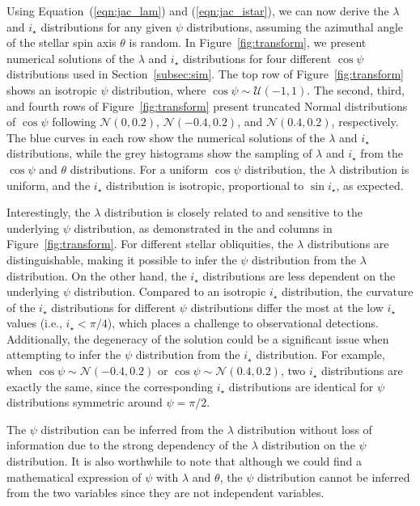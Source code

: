 \documentclass[twocolumn,times,linenumbers]{aastex631}
\begin{document}
Using Equation~(\ref{eqn:jac_lam}) and (\ref{eqn:jac_istar}), we can now derive the $\lambda$ and $i_\star$ distributions for any given $\psi$ distributions, assuming the azimuthal angle of the stellar spin axis $\theta$ is random. In Figure~\ref{fig:transform}, we present numerical solutions of the $\lambda$ and $i_\star$ distributions for four different $\cos{\psi}$ distributions used in Section~\ref{subsec:sim}. The top row of Figure~\ref{fig:transform} shows an isotropic $\psi$ distribution, where $\cos{\psi} \sim \mathcal{U}(-1,1)$. The second, third, and fourth rows of Figure~\ref{fig:transform} present truncated Normal distributions of $\cos{\psi}$ following $\mathcal{N}(0,0.2)$, $\mathcal{N}(-0.4,0.2)$, and $\mathcal{N}(0.4,0.2)$, respectively.
The blue curves in each row show the numerical solutions of the $\lambda$ and $i_\star$ distributions, while the grey histograms show the sampling of $\lambda$ and $i_\star$ from the $\cos{\psi}$ and $\theta$ distributions. 
For a uniform $\cos{\psi}$ distribution, the $\lambda$ distribution is uniform, and the $i_\star$ distribution is isotropic, proportional to $\sin{i_\star}$, as expected.

Interestingly, the $\lambda$ distribution is closely related to and sensitive to the underlying $\psi$ distribution, as demonstrated in the  and  columns in Figure~\ref{fig:transform}. For different stellar obliquities, the $\lambda$ distributions are distinguishable, making it possible to infer the $\psi$ distribution from the $\lambda$ distribution. On the other hand, the $i_\star$ distributions are less dependent on the underlying $\psi$ distribution. Compared to an isotropic $i_\star$ distribution, the curvature of the $i_\star$ distributions for different $\psi$ distributions differ the most at the low $i_\star$ values (i.e., $i_\star < \pi/4$), which places a challenge to observational detections. 
Additionally, the degeneracy of the solution could be a significant issue when attempting to infer the $\psi$ distribution from the $i_\star$ distribution. For example, when $\cos{\psi} \sim \mathcal{N}(-0.4,0.2)$ or $\cos{\psi} \sim \mathcal{N}(0.4,0.2)$, two $i_\star$ distributions are exactly the same, since the corresponding $i_\star$ distributions are identical for $\psi$ distributions symmetric around $\psi = \pi/2$.

The $\psi$ distribution can be inferred from the $\lambda$ distribution without loss of information due to the strong dependency of the $\lambda$ distribution on the $\psi$ distribution. It is also worthwhile to note that although we could find a mathematical expression of $\psi$ with $\lambda$ and $\theta$, the $\psi$ distribution cannot be inferred from the two variables since they are not independent variables.
\end{document}
